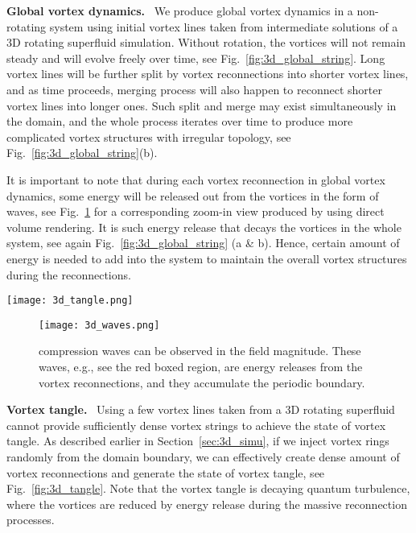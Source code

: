 \documentclass[10pt,journal,compsoc,twoside]{IEEEtran}
\newcommand{\bl}[1]{{\color{black}{#1}}}
\begin{document}
	\vspace{0.15cm}
	\noindent
	\textbf{Global vortex dynamics.} \
	We produce global vortex dynamics in a non-rotating system using initial vortex lines taken from intermediate solutions of a 3D rotating superfluid simulation.
	Without rotation, the vortices will not remain steady and will evolve freely over time, see Fig.~\ref{fig:3d_global_string}.
	Long vortex lines will be further split by vortex reconnections into shorter vortex lines, and as time proceeds, merging process will also happen to reconnect shorter vortex lines into longer ones.
	Such split and merge may exist simultaneously in the domain, and the whole process iterates over time to produce more complicated vortex structures with irregular topology, see Fig.~\ref{fig:3d_global_string}(b).
	
	It is important to note that during each vortex reconnection in global vortex dynamics, some energy will be released out from the vortices in the form of waves, see Fig.~\ref{fig:3d_waves} for a corresponding zoom-in view produced by using direct volume rendering.
	It is such energy release that decays the vortices in the whole system, see again Fig.~\ref{fig:3d_global_string} (a \& b).
	Hence, certain amount of energy is needed to add into the system to maintain the overall vortex structures during the reconnections.
	
	\begin{figure*}[!t]
		\centering
		\texttt{[image: 3d\_tangle.png]}
		\caption{Snapshots showing the decaying process of the 3D vortex tangle.
		Note that the energy release during the massive reconnection processes dacays the overall vortices over time.}
		\label{fig:3d_tangle}
	\end{figure*}
	
	\begin{figure}[!t]
		\centering
		\texttt{[image: 3d\_waves.png]}
		\caption{\bl{By applying direct volume rendering,} compression waves can be observed in the field magnitude.
			These waves, e.g., see the red boxed region, are energy releases from the vortex reconnections, and they accumulate \bl{by the transmission through} the periodic boundary.
		}
		\label{fig:3d_waves}
	\end{figure}
	
	\vspace{0.15cm}
	\noindent
	\textbf{Vortex tangle.} \
	Using a few vortex lines taken from a 3D rotating superfluid cannot provide sufficiently dense vortex strings to achieve the state of vortex tangle.
	As described earlier in Section~\ref{sec:3d_simu}, if we inject vortex rings randomly from the domain boundary, we can effectively create dense amount of vortex reconnections and generate the state of vortex tangle, see Fig.~\ref{fig:3d_tangle}.
	Note that the vortex tangle is decaying quantum turbulence, where the vortices are reduced by energy release during the massive reconnection processes.
	
\end{document}
